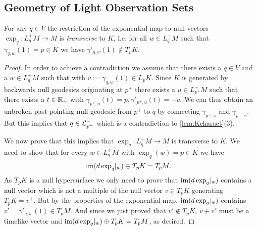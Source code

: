 

\subsection{Geometry of Light Observation Sets}


\begin{lemma}\label{prop:transversality}
For any $q\in V$ the restriction of the exponential map to null vectors $\exp_q:L^+_qM\to M$ is \emph{transverse} to $K$, i.e. for all $w\in L^+_qM$ such that $\gamma_{q,w}(1) = p\in K$ we have $\gamma'_{q,w}(1)\notin T_pK$.
\end{lemma}
\begin{proof}
    In order to achieve a contradiction we assume that there exists a $q\in V$ and a $w\in L^+_qM$ such that with $v:=\gamma_{q,w}(1)\in L_pK$.
    Since $K$ is generated by backwards null geodesics originating at $p^+$ there exists a $u\in L^-_{p^+}M$ such that there exists a $t\in \mathbb{R}_+$ with $\gamma_{p^+,u}(t)=p, \gamma'_{p^+,u}(t)=-v$. We can thus obtain an unbroken past-pointing null geodesic from $p^+$ to $q$ by connecting $\gamma_{p^+,u}$ and $\gamma_{p,-v}$. But this implies that $q\in \mathcal{L}^-_{p^+}$ which is a contradiction to \ref{lem:Kcharact}(3).

    We now prove that this implies that $\exp_q:L^+_qM\to M$ is transverse to $K$. We need to show that for every $w\in L^+_qM$ with $\exp_q(w)=p\in K$ we have 
    \[
        \operatorname{im}(d\exp_q\rvert_w) \oplus T_pK = T_pM.
    \]
    As $T_pK$ is a null hypersurface we only need to prove that $\operatorname{im}(d\exp_q\rvert_w)$ contains a null vector which is not a multiple of the null vector $v\in T_pK$ generating $T_pK = v^\perp$. But by the properties of the exponential map, $\operatorname{im}(d\exp_q\rvert_w)$ contains $v' = \gamma'_{q,w}(1) \in T_pM$. And since we just proved that $v'\notin T_pK$, $v+v'$ must be a timelike vector and $\operatorname{im}(d\exp_q\rvert_w) \oplus T_pK = T_pM$, as desired.
\end{proof}


